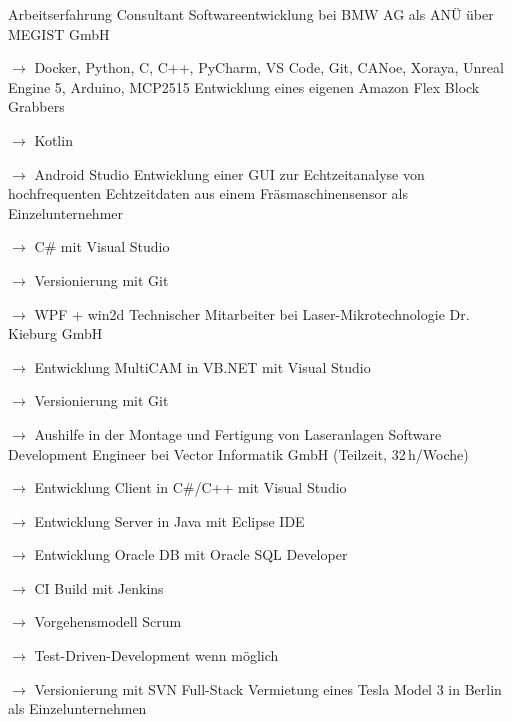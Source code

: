 \begin{rubric}{\textcolor{black!20!blue!100}{Arbeitserfahrung}}%
			\entry*[05/2023 --- 02/2024]
				Consultant Softwareentwicklung bei BMW AG als ANÜ über \glqq MEGIST GmbH\grqq
				
				\setlength{\hangindent}{\widthof{$\rightarrow$ }}
				$\rightarrow$ Docker, Python, C, C++, PyCharm, VS Code, Git, CANoe, Xoraya, Unreal Engine 5, Arduino, MCP2515
			\entry*[2021 --- 2022]
				Entwicklung eines eigenen Amazon Flex Block Grabbers
				
				\setlength{\hangindent}{\widthof{$\rightarrow$ }}
				$\rightarrow$ Kotlin
				
				$\rightarrow$ Android Studio
			\entry*[03/2020 --- 05/2020]
				Entwicklung einer GUI zur Echtzeitanalyse von hochfrequenten Echtzeitdaten aus einem Fräsmaschinensensor als Einzelunternehmer
				
				\setlength{\hangindent}{\widthof{$\rightarrow$ }}
				$\rightarrow$ C\# mit Visual Studio
				
				$\rightarrow$ Versionierung mit Git
				
				$\rightarrow$ WPF + win2d
			\entry*[04/07/2019 --- 30/09/2020]
				Technischer Mitarbeiter bei \glqq Laser-Mikrotechnologie Dr. Kieburg GmbH\grqq
				
				\setlength{\hangindent}{\widthof{$\rightarrow$ }}
				$\rightarrow$ Entwicklung MultiCAM in VB.NET mit Visual Studio
				
				$\rightarrow$ Versionierung mit Git
				
				$\rightarrow$ Aushilfe in der Montage und Fertigung von Laseranlagen
			\entry*[11/2017 --- 03/2019]
				Software Development Engineer bei Vector Informatik GmbH (Teilzeit, 32\,h/Woche)
				
				\setlength{\hangindent}{\widthof{$\rightarrow$ }}
				$\rightarrow$ Entwicklung Client in C\#/C++ mit Visual Studio
				
				$\rightarrow$ Entwicklung Server in Java mit Eclipse IDE
				
				$\rightarrow$ Entwicklung Oracle DB mit Oracle SQL Developer
				
				$\rightarrow$ CI Build mit Jenkins
				
				$\rightarrow$ Vorgehensmodell Scrum
				
				$\rightarrow$ Test-Driven-Development wenn möglich
				
				$\rightarrow$ Versionierung mit SVN
			\entry*[10/2019 --- 03/2023]
				Full-Stack Vermietung eines Tesla Model 3 in Berlin als Einzelunternehmen
				

\end{rubric}

